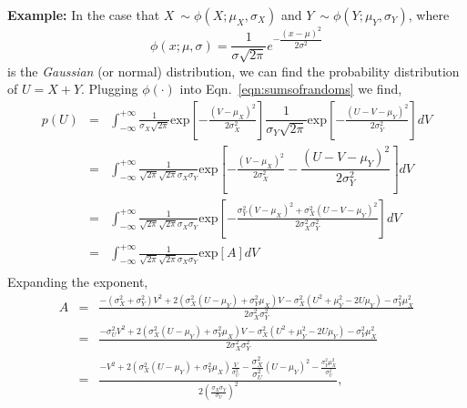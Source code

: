 \begin{tcolorbox}[colback=backblue]
\textbf{Example:} In the case that $X~\sim\phi(X;\mu_{X},\sigma_{X})$ and $Y~\sim\phi(Y;\mu_{Y},\sigma_{Y})$, where 
\begin{equation}\label{eqn:gaussian}
    \phi(x;\mu,\sigma) = \dfrac{1}{\sigma\sqrt{2\pi}} e^{-\dfrac{(x-\mu)^2}{2\sigma^{2}}}
\end{equation}
is the \emph{Gaussian} (or normal) distribution, we can find the probability distribution of $U=X+Y$. Plugging $\phi(\cdot)$ into Eqn.~\ref{eqn:sumsofrandoms} we find, 
\begin{eqnarray}
    p(U) & = & \int_{-\infty}^{+\infty}\frac{1}{\sigma_{X}\sqrt{2\pi}} \mathrm{exp}\left[{-\frac{(V-\mu_{X})^2}{2\sigma_{X}^{2}}}\right]\dfrac{1}{\sigma_{Y}\sqrt{2\pi}} \mathrm{exp}\left[{-\frac{(U-V-\mu_{Y})^2}{2\sigma_{Y}^{2}}}\right]dV\\
    & = & \int_{-\infty}^{+\infty} 
    \frac{1}{\sqrt{2\pi}\sqrt{2\pi}\sigma_{X}\sigma_{Y}} 
    \mathrm{exp}\left[{-\frac{(V-\mu_{X})^2}{2\sigma_{X}^{2}}-\dfrac{(U-V-\mu_{Y})^2}{2\sigma_{Y}^{2}}}\right]dV\\
    & = &   \int_{-\infty}^{+\infty} 
    \frac{1}{\sqrt{2\pi}\sqrt{2\pi}\sigma_{X}\sigma_{Y}} 
    \mathrm{exp}\left[
    -\frac{\sigma_{Y}^{2}(V-\mu_{X})^2 +\sigma_{X}^{2}(U-V-\mu_{Y})^2} {2\sigma_{X}^{2} \sigma_{Y}^{2}}
    \right]dV\\
    & = &   \int_{-\infty}^{+\infty} 
    \frac{1}{\sqrt{2\pi}\sqrt{2\pi}\sigma_{X}\sigma_{Y}} 
    \mathrm{exp}\left[
    A 
    \right]dV\\
\end{eqnarray}    
Expanding the exponent,
\begin{eqnarray}
    A
    & = & \frac{-(\sigma_{X}^{2}+\sigma_{Y}^{2})V^{2}+2\left(\sigma_{X}^{2}(U-\mu_{Y})+\sigma_{Y}^{2}\mu_{X}\right)V -\sigma_{X}^{2}(U^{2}+\mu_{Y}^{2}-2U\mu_{Y})-\sigma_{Y}^{2}\mu_{X}^{2}}{2\sigma_{X}^{2} \sigma_{Y}^{2}}\\
    & = & \frac{-\sigma_{U}^{2}V^{2}+2\left(\sigma_{X}^{2}(U-\mu_{Y})+\sigma_{Y}^{2}\mu_{X}\right)V -\sigma_{X}^{2}(U^{2}+\mu_{Y}^{2}-2U\mu_{Y})-\sigma_{Y}^{2}\mu_{X}^{2}}{{2\sigma_{X}^{2} \sigma_{Y}^{2}}}\\
    & = & \frac{-V^{2}+2\left(\sigma_{X}^{2}(U-\mu_{Y})+\sigma_{Y}^{2}\mu_{X}\right)\frac{V}{\sigma_{U}^{2}} -\dfrac{\sigma_{X}^{2}}{\sigma_{U}^{2}}(U-\mu_{Y})^{2}-\frac{\sigma_{Y}^{2}\mu_{X}^{2}}{\sigma_{U}^{2}}}{2\left(\frac{\sigma_{X} \sigma_{Y}}{\sigma_{U}}\right)^{2}},
 \end{eqnarray}   

\end{tcolorbox}
